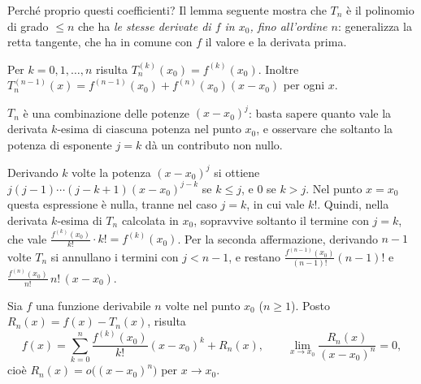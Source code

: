 Perché proprio questi coefficienti? Il lemma seguente mostra che $T_{n}$ è il polinomio
di grado $\le n$ che ha \emph{le stesse derivate di $f$ in $x_{0}$, fino all'ordine
$n$}: generalizza la retta tangente, che ha in comune con $f$ il valore e la derivata
prima.

\begin{lemma}\label{lem:derivate-taylor}
Per $k=0,1,\dots,n$ risulta $T_{n}^{(k)}(x_{0})=f^{(k)}(x_{0})$. Inoltre
$T_{n}^{(n-1)}(x)=f^{(n-1)}(x_{0})+f^{(n)}(x_{0})(x-x_{0})$ per ogni $x$.
\end{lemma}

\begin{schema}
\end{schema}

\begin{strategia}
$T_{n}$ è una combinazione delle potenze $(x-x_{0})^{j}$: basta sapere quanto vale la
derivata $k$-esima di ciascuna potenza nel punto $x_{0}$, e osservare che soltanto la
potenza di esponente $j=k$ dà un contributo non nullo.
\end{strategia}

\begin{dimostrazione}
Derivando $k$ volte la potenza $(x-x_{0})^{j}$ si ottiene
$j(j-1)\cdots(j-k+1)(x-x_{0})^{j-k}$ se $k\le j$, e $0$ se $k>j$. Nel punto $x=x_{0}$
questa espressione è nulla, tranne nel caso $j=k$, in cui vale $k!$. Quindi, nella
derivata $k$-esima di $T_{n}$ calcolata in $x_{0}$, sopravvive soltanto il termine con
$j=k$, che vale $\frac{f^{(k)}(x_{0})}{k!}\cdot k!=f^{(k)}(x_{0})$. Per la seconda
affermazione, derivando $n-1$ volte $T_{n}$ si annullano i termini con $j<n-1$, e
restano $\frac{f^{(n-1)}(x_{0})}{(n-1)!}(n-1)!$ e
$\frac{f^{(n)}(x_{0})}{n!}\,n!\,(x-x_{0})$.
\end{dimostrazione}

\begin{teorema}\label{teo:taylor}
\index{formula di Taylor}\index{teorema!di Taylor}
Sia $f$ una funzione derivabile $n$ volte nel punto $x_{0}$ ($n\ge1$). Posto
$R_{n}(x)=f(x)-T_{n}(x)$, risulta
\begin{equation}\label{eq:taylor}
  f(x)=\sum_{k=0}^{n}\frac{f^{(k)}(x_{0})}{k!}(x-x_{0})^{k}+R_{n}(x), \qquad
  \lim_{x\to x_{0}}\frac{R_{n}(x)}{(x-x_{0})^{n}}=0 ,
\end{equation}
cioè $R_{n}(x)=o\bigl((x-x_{0})^{n}\bigr)$ per $x\to x_{0}$.
\end{teorema}

